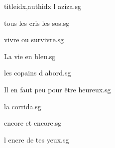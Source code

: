 \documentclass[
    ]{article}
\begin{document}
\begin{songs}{titleidx,authidx}
{l aziza.sg}


{tous les cris les sos.sg}


{vivre ou survivre.sg}


{La vie en bleu.sg}


{les copains d abord.sg}


{Il en faut peu pour être heureux.sg}


{la corrida.sg}


{encore et encore.sg}


{l encre de tes yeux.sg}



\end{songs}
\end{document}
